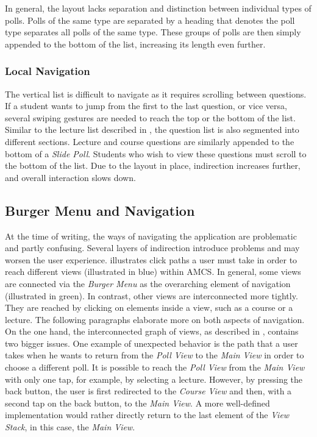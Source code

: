 In general, the layout lacks separation and distinction between individual types of polls.
Polls of the same type are separated by a heading that denotes the poll type separates all polls of the same type. These groups of polls are then simply appended to the bottom of the list, increasing its length even further.
\todogrf
\subsubsection{Local Navigation}

The vertical list is difficult to navigate as it requires scrolling between questions. If a student wants to jump from the first to the last question, or vice versa, several swiping gestures are needed to reach the top or the bottom of the list.
Similar to the lecture list described in , the question list is also segmented into different sections. Lecture and course questions are similarly appended to the bottom of a \emph{Slide Poll}. Students who wish to view these questions must scroll to the bottom of the list. Due to the layout in place, indirection increases further, and overall interaction slows down.



\subsection{Burger Menu and Navigation}
\label{section:con:problems:navigation}

At the time of writing, the ways of navigating the application are problematic and partly confusing. Several layers of indirection introduce problems and may worsen the user experience.
 illustrates click paths a user must take in order to reach different views (illustrated in blue) within AMCS. In general, some views are connected via the \emph{Burger Menu} as the overarching element of navigation (illustrated in green). In contrast, other views are interconnected more tightly. They are reached by clicking on elements inside a view, such as a course or a lecture. The following paragraphs elaborate more on both aspects of navigation.
\newline
\newline
On the one hand, the interconnected graph of views, as described in , contains two bigger issues. One example of unexpected behavior is the path that a user takes when he wants to return from the \emph{Poll View} to the \emph{Main View} in order to choose a different poll.
It is possible to reach the \emph{Poll View} from the \emph{Main View} with only one tap, for example, by selecting a lecture.
However, by pressing the back button, the user is first redirected to the \emph{Course View} and then, with a second tap on the back button, to the \emph{Main View}. A more well-defined implementation would rather directly return to the last element of the \emph{View Stack}, in this case, the \emph{Main View}.

